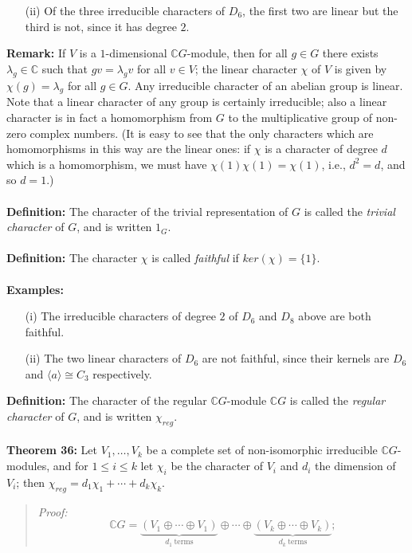 {\begin{itemize}
\item[(ii)] Of the three irreducible characters of $D_6$, the first two are
linear but the third is not, since it has degree $2$.
\end{itemize}
{\bf Remark:}
If $V$ is a $1$-dimensional ${\mathbb C}G$-module, then for all $g\in G$ there exists
$\lambda_g\in{\mathbb C}$ such that $gv=\lambda_gv$ for all $v\in V$; the linear
character $\chi$ of $V$ is given by $\chi(g)=\lambda_g$ for all $g\in G$.
Any irreducible character of an abelian group is linear.
Note that a linear character of any group is certainly irreducible; also a
linear character is in fact a homomorphism from $G$ to the multiplicative
group of non-zero complex numbers. (It is easy to see that the only characters
which are homomorphisms in this way are the linear ones: if $\chi$ is a
character of degree $d$ which is a homomorphism, we must have
$\chi(1)\chi(1)=\chi(1)$, i.e., $d^2=d$, and so $d=1$.)
\\
\\
{\bf Definition:} The character of the trivial representation of
$G$ is called the \emph{trivial character} of $G$, and is written $1_G$.
\\
\\
{\bf Definition:} The character $\chi$ is called \emph{faithful} if
$ker(\chi)=\{1\}$.
\\
\\
{\bf Examples:}
\begin{itemize}
\item[(i)] The irreducible characters of degree $2$ of $D_6$ and
$D_8$ above are both faithful.
\item[(ii)] The two linear characters of $D_6$ are not faithful, since their
kernels are $D_6$ and $\langle a\rangle\cong C_3$ respectively.
\end{itemize}
{\bf Definition:} The character of the regular ${\mathbb C}G$-module ${\mathbb C}G$ is
called the \emph{regular character} of $G$, and is written $\chi_{reg}$.
\\
\\
{\bf Theorem 36:} Let $V_1,\dots,V_k$ be a complete set of
non-isomorphic irreducible ${\mathbb C}G$-modules, and for $1\leq i\leq k$ let
$\chi_i$ be the character of $V_i$ and $d_i$ the dimension of $V_i$; then
$\chi_{reg}=d_1\chi_1+\cdots+d_k\chi_k$.
\begin{quote}
\emph{Proof:}
$${\mathbb C}G=\underbrace{(V_1\oplus\cdots\oplus V_1)}_{d_1\ \mathrm{terms}}\oplus
\cdots\oplus\underbrace{(V_k\oplus\cdots\oplus V_k)}_{d_k\ \mathrm{terms}};$$

\end{quote}}
